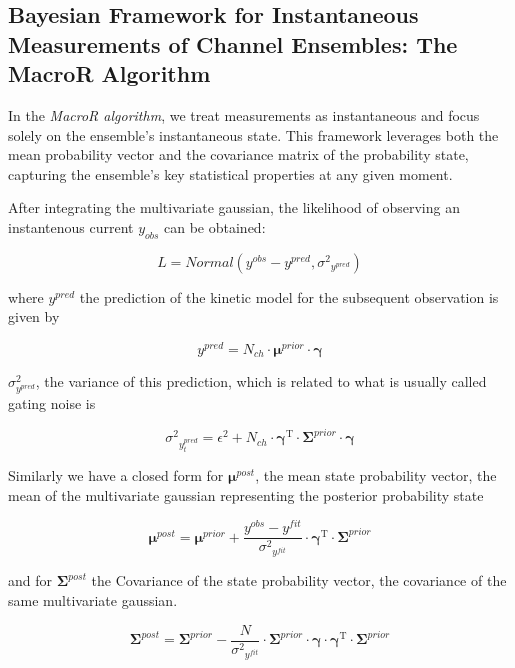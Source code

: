 \documentclass[pdflatex,sn-mathphys-num]{sn-jnl}%
\theoremstyle{thmstyleone}%
\theoremstyle{thmstyletwo}%
\theoremstyle{thmstylethree}%
\begin{document}
\subsection{Bayesian Framework for Instantaneous Measurements of Channel Ensembles: The MacroR Algorithm}

In the \textit{MacroR algorithm}, we treat measurements as instantaneous and focus solely on the ensemble's instantaneous state. This framework leverages both the mean probability vector and the covariance matrix of the probability state, capturing the ensemble's key statistical properties at any given moment.

After integrating the multivariate gaussian, the likelihood of observing an instantenous current $y_{obs}$ can be obtained:

\begin{equation}
	L= Normal \left (y^{obs}-y^{pred}, {\sigma^2}_{y^{pred}} \right)
\end{equation}

where $y^{pred}$ the prediction of the kinetic model for the subsequent observation is given by

\begin{equation}
	y^{pred} = N_{ch} \cdot \mathbf \mu^{prior} \cdot \mathbf \gamma
\end{equation}

$\sigma^2_{y^{pred}}$, the variance of this prediction, which is related to what is usually called gating noise is 

\begin{equation}
	{\sigma^2}_{y^{pred}_{t}}
	= \epsilon^2 +N_{ch} \cdot {\mathbf \gamma}^{\mathrm{T}} \cdot \mathbf \Sigma^{prior} \cdot \mathbf \gamma
\end{equation}


Similarly we have a closed form for $\mathbf \mu^{post}$, the mean state probability vector, the mean of the multivariate gaussian representing the posterior probability state 

\begin{equation}
	\mathbf \mu^{post}= \mathbf \mu^{prior} + {\frac {y^{obs} - y^{fit}}{{\sigma^2}_{y^{fit}} }}\cdot {\mathbf \gamma}^\mathrm{T} \cdot \mathbf \Sigma^{prior} 
\end{equation}

and for $\mathbf \Sigma^{post}$ the Covariance of the state probability vector, the covariance of the same multivariate gaussian. 
 

\begin{equation}
	\mathbf \Sigma^{post} = \mathbf \Sigma^{prior} - {\frac {N}{{\sigma^2}_{y^{fit}}}}\cdot \mathbf \Sigma^{prior} \cdot \mathbf \gamma \cdot {\mathbf \gamma}^\mathrm{T} \cdot \mathbf \Sigma^{prior}
\end{equation}
\end{document}

